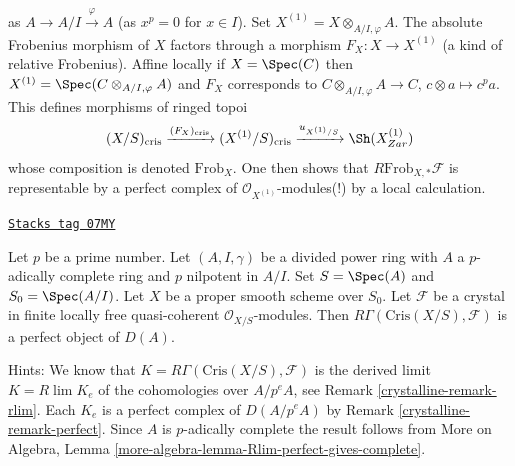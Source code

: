 \begin{remark}[Perfectness]
as $A \to A/I \xrightarrow{\varphi} A$ (as $x^p = 0$ for $x \in I$). Set
$X^{(1)} = X \otimes_{A/I, \varphi} A$. The absolute Frobenius morphism
of $X$ factors through a morphism $F_X : X \to X^{(1)}$ (a kind of
relative Frobenius). Affine locally if $X = \Spec(C)$ then
$X^{(1)} = \Spec( C \otimes_{A/I, \varphi} A)$
and $F_X$ corresponds to $C \otimes_{A/I, \varphi} A \to C$,
$c \otimes a \mapsto c^pa$. This defines morphisms of ringed topoi
$$
(X/S)_{\text{cris}}
\xrightarrow{(F_X)_{\text{cris}}}
(X^{(1)}/S)_{\text{cris}}
\xrightarrow{u_{X^{(1)}/S}}
\Sh(X^{(1)}_{Zar})
$$
whose composition is denoted $\text{Frob}_X$. One then shows that
$R\text{Frob}_{X, *}\mathcal{F}$ is representable by a
perfect complex of $\mathcal{O}_{X^{(1)}}$-modules(!)
by a local calculation.
\end{remark}

\begin{remark}

\label{crystalline-remark-complete-perfect}
\href{https://stacks.math.columbia.edu/tag/07MY}{\texttt{Stacks tag 07MY}}

Let $p$ be a prime number. Let $(A, I, \gamma)$ be a divided power
ring with $A$ a $p$-adically complete ring and $p$ nilpotent in $A/I$. Set
$S = \Spec(A)$ and $S_0 = \Spec(A/I)$. Let $X$ be a proper
smooth scheme over $S_0$. Let $\mathcal{F}$ be a crystal in
finite locally free quasi-coherent $\mathcal{O}_{X/S}$-modules.
Then $R\Gamma(\text{Cris}(X/S), \mathcal{F})$ is a
perfect object of $D(A)$.

\medskip\noindent
Hints: We know that $K = R\Gamma(\text{Cris}(X/S), \mathcal{F})$
is the derived limit $K = R\lim K_e$ of the cohomologies over $A/p^eA$,
see Remark \ref{crystalline-remark-rlim}.
Each $K_e$ is a perfect complex of $D(A/p^eA)$ by
Remark \ref{crystalline-remark-perfect}.
Since $A$ is $p$-adically complete the result
follows from
More on Algebra, Lemma \ref{more-algebra-lemma-Rlim-perfect-gives-complete}.
\end{remark}

